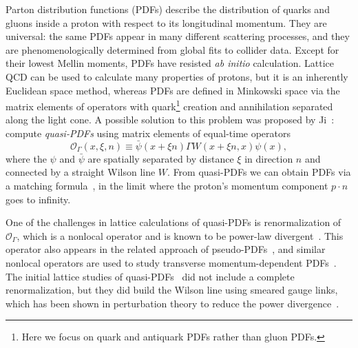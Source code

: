 \documentclass[prl,reprint,notitlepage,nofootinbib]{revtex4-1}
\newcommand{\cO}{\mathcal{O}}
\begin{document}
Parton distribution functions (PDFs) describe the distribution of
quarks and gluons inside a proton with respect to its longitudinal
momentum. They are universal: the same PDFs appear in many different
scattering processes, and they are phenomenologically determined from
global fits to collider data. Except for their lowest Mellin moments,
PDFs have resisted \emph{ab initio} calculation. Lattice QCD can be
used to calculate many properties of protons, but it is an inherently
Euclidean space method, whereas PDFs are defined in Minkowski space
via the matrix elements of operators with quark\footnote{Here we focus
  on quark and antiquark PDFs rather than gluon PDFs.} creation and
annihilation separated along the light cone. A possible solution to
this problem was proposed by Ji~\cite{Ji:2013dva}: compute
\emph{quasi-PDFs} using matrix elements of equal-time operators
\begin{equation}
  \cO_\Gamma(x,\xi,n) \equiv
  \bar\psi(x+\xi n) \Gamma W(x+\xi n,x)\psi(x),
\end{equation}
where the $\psi$ and $\bar\psi$ are spatially separated by distance
$\xi$ in direction $n$ and connected by a straight Wilson line
$W$. From quasi-PDFs we can obtain PDFs via a matching
formula~\cite{Xiong:2013bka,Alexandrou:2015rja}, in the limit where
the proton's momentum component $p\cdot n$ goes to infinity.

One of the challenges in lattice calculations of quasi-PDFs is
renormalization of $\cO_\Gamma$, which is a nonlocal operator and is
known to be power-law divergent~\cite{Ishikawa:2016znu,Chen:2016fxx}.
This operator also appears in the related approach of
pseudo-PDFs~\cite{Radyushkin:2017cyf,Orginos:2017kos}, and similar
nonlocal operators are used to study transverse momentum-dependent
PDFs~\cite{Musch:2011er,Engelhardt:2015xja,Yoon:2017qzo}.
The initial lattice studies of
quasi-PDFs~\cite{Lin:2014zya,Alexandrou:2015rja,Chen:2016utp,Alexandrou:2016jqi}
did not include a complete renormalization, but they did build the
Wilson line using smeared gauge links, which has been shown in
perturbation theory to reduce the power
divergence~\cite{Ishikawa:2016znu}.
\end{document}
